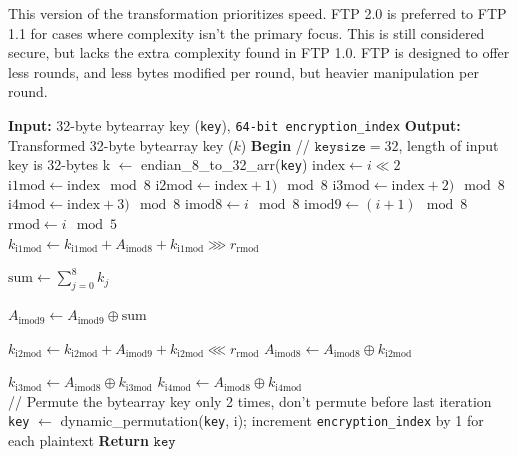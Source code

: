 \documentclass[11pt]{article}
\theoremstyle{definition}
\theoremstyle{remark}
\newcommand{\COMMENT}[1]{\State \textcolor[HTML]{003e57}{// #1}}
\begin{document}
This version of the transformation prioritizes speed. FTP 2.0 is preferred to FTP 1.1 for cases where complexity isn't the primary focus. This is still considered secure, but lacks the extra complexity found in FTP 1.0. FTP is designed to offer less rounds, and less bytes modified per round, but heavier manipulation per round.

\begin{algorithm}[H] %
\caption{The key transformation operation per encryption}
\begin{algorithmic}[1]  %
\State \textbf{Input:} 32-byte bytearray key (\texttt{key}), \texttt{64-bit encryption\_index}
\State \textbf{Output:} Transformed 32-byte bytearray key ($k$)
\State \textbf{Begin}
\COMMENT{$\texttt{keysize} = 32$, length of input key is 32-bytes}
\State k $\gets$ endian\_8\_to\_32\_arr(\texttt{key})
	\State $\mathrm{index} \gets i \ll 2$
	\State $\mathrm{i1mod} \gets \mathrm{index} \mod 8$
	\State $\mathrm{i2mod} \gets \mathrm{index}+1) \mod 8$
	\State $\mathrm{i3mod} \gets \mathrm{index}+2) \mod 8$
	\State $\mathrm{i4mod} \gets \mathrm{index}+3) \mod 8$
	\State $\mathrm{imod8} \gets i \mod 8$
	\State $\mathrm{imod9} \gets (i+1) \mod 8$
	\State $\mathrm{rmod} \gets i \mod 5$ \\
	
	\State $k_\mathrm{i1mod} \gets k_\mathrm{i1mod} + A_\mathrm{imod8} + k_\mathrm{i1mod} \ggg r_\mathrm{rmod}$

	\State $ \mathrm{sum} \gets \displaystyle \sum_{j=0}^8 k_j$

	\State $A_\mathrm{imod9} \gets A_\mathrm{imod9} \oplus \mathrm{sum}$

	\State $k_\mathrm{i2mod} \gets k_\mathrm{i2mod} + A_\mathrm{imod9} + k_\mathrm{i2mod} \lll r_\mathrm{rmod}$
	\State $A_\mathrm{imod8} \gets A_\mathrm{imod8} \oplus k_\mathrm{i2mod}$

	\State $k_\mathrm{i3mod} \gets A_\mathrm{imod8} \oplus k_\mathrm{i3mod}$
	\State $k_\mathrm{i4mod} \gets A_\mathrm{imod8} \oplus k_\mathrm{i4mod}$ \\

	\COMMENT{Permute the bytearray key only 2 times, don't permute before last iteration}
		\State \texttt{key} $\gets$ dynamic\_permutation(\texttt{key}, i);
	\EndIf
\EndFor
\State increment \texttt{encryption\_index} by 1 for each plaintext
\State \textbf{Return} $\texttt{key}$
\end{algorithmic}
\end{algorithm}
\end{document}
